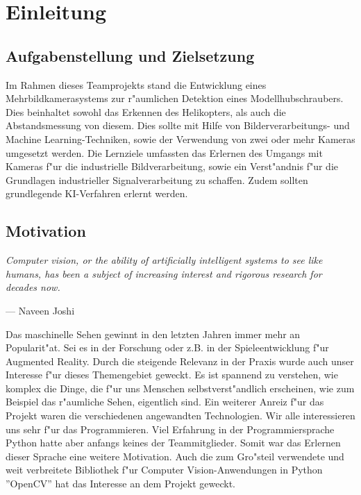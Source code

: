 \chapter{Einleitung}
\label{cha:einleitung}

\section{Aufgabenstellung und Zielsetzung}
\label {sec:aufgabenstellungzielsetzung}

Im Rahmen dieses Teamprojekts stand die Entwicklung eines Mehrbildkamerasystems zur r"aumlichen Detektion eines Modellhubschraubers. Dies beinhaltet sowohl das Erkennen des Helikopters, als auch die Abstandsmessung von diesem. Dies sollte mit Hilfe von Bilderverarbeitungs- und Machine Learning-Techniken, sowie der Verwendung von zwei oder mehr Kameras umgesetzt werden.\newline
Die Lernziele umfassten das Erlernen des Umgangs mit Kameras f"ur die industrielle Bildverarbeitung, sowie ein Verst"andnis f"ur die Grundlagen industrieller Signalverarbeitung zu schaffen. Zudem sollten grundlegende KI-Verfahren erlernt werden.

\newpage

\section{Motivation}
\label {sec:motivation}

\setlength\epigraphwidth{15cm}
\setlength\epigraphrule{0pt}

\epigraph{\textit{\glqq Computer vision, or the ability of artificially intelligent systems to see like humans, has been a subject of increasing interest and rigorous research for decades now.\grqq{}}}{--- \textup{}Naveen Joshi\cite{NJ}\\}

\noindent Das maschinelle Sehen gewinnt in den letzten Jahren immer mehr an Popularit"at. Sei es in der Forschung oder z.B. in der Spieleentwicklung f"ur Augmented Reality. Durch die steigende Relevanz in der Praxis wurde auch unser Interesse f"ur dieses Themengebiet geweckt. Es ist spannend zu verstehen, wie komplex die Dinge, die f"ur uns Menschen selbstverst"andlich erscheinen, wie zum Beispiel das r"aumliche Sehen, eigentlich sind.
Ein weiterer Anreiz f"ur das Projekt waren die verschiedenen angewandten Technologien. Wir alle interessieren uns sehr f"ur das Programmieren. Viel Erfahrung in der Programmiersprache Python hatte aber anfangs keines der Teammitglieder. Somit war das Erlernen dieser Sprache eine weitere Motivation.\newline
Auch die zum Gro"steil verwendete und weit verbreitete Bibliothek f"ur Computer Vision-Anwendungen in Python ''OpenCV'' hat das Interesse an dem Projekt geweckt.

